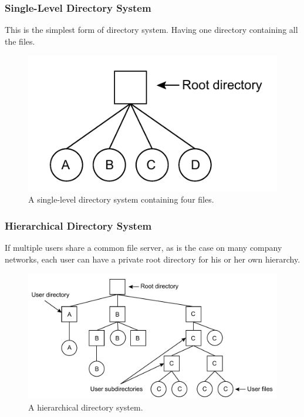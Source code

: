 \documentclass[11pt,a4paper]{article}
\begin{document}
\subsubsection{Single-Level Directory System}
This is the simplest form of directory system. Having one directory containing all the files. 

\begin{figure}[h!]
	\centering
		\includegraphics{img/single.pdf}
	\caption{A single-level directory system containing four files.}
\end{figure}

\subsubsection{Hierarchical Directory System}
If multiple users share a common file server, as is the case on many company networks, each user can have a private root directory for his or her own hierarchy. 

\begin{figure}[h!]
	\centering
		\includegraphics[width=\linewidth]{img/hir.pdf}
	\caption{A hierarchical directory system.}
\end{figure}
\end{document}
